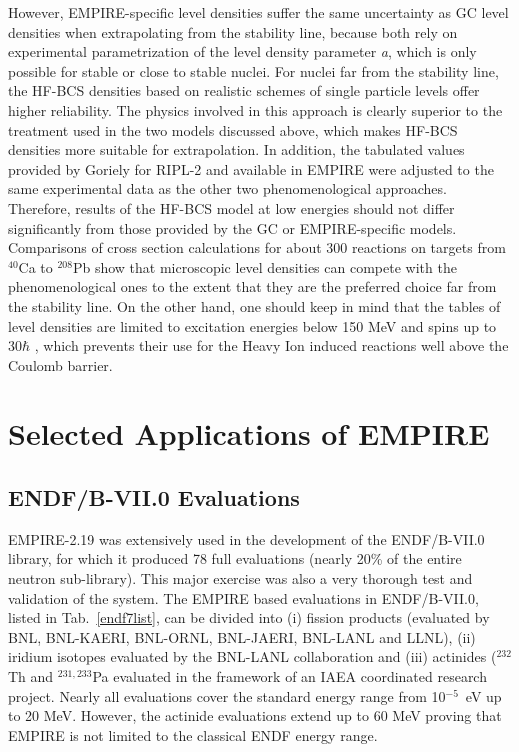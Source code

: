 However, EMPIRE-specific level densities suffer the same uncertainty
as GC level densities
when extrapolating from the stability line, because both rely on
experimental parametrization of the level density parameter \textit{a},
which is only possible for stable or close to stable nuclei. For nuclei far
from the stability line, the HF-BCS densities based on realistic schemes of
single particle levels offer higher reliability. The physics involved in
this approach is clearly superior to the treatment used in the two models
discussed above, which makes HF-BCS densities more suitable for
extrapolation. In addition, the tabulated values provided by Goriely for
RIPL-2 and available in EMPIRE were adjusted to the same experimental data
as the other two phenomenological approaches. Therefore, results of the
HF-BCS model at low energies should not differ significantly from those
provided by the GC or EMPIRE-specific models. Comparisons of cross section
calculations for about 300 reactions on targets from $^{40}$Ca to $^{208}$Pb
show that microscopic level densities can compete with the phenomenological
ones to the extent that they are the preferred choice far from the
stability line. On the other hand, one should keep in mind that the tables of
level densities are limited to excitation energies below 150 MeV and spins
up to 30$\hbar$ , which prevents their use for the Heavy Ion induced
reactions well above the Coulomb barrier.

\section{Selected Applications of EMPIRE}

\subsection{ENDF/B-VII.0 Evaluations}

EMPIRE-2.19 was extensively used in the development of the ENDF/B-VII.0
library, for which it produced 78 full evaluations (nearly 20\% of the entire
neutron sub-library). This major exercise was also a very thorough test and
validation of the system. The EMPIRE based evaluations in ENDF/B-VII.0,
listed in Tab.~\ref{endf7list}, can be divided into (i) fission products
(evaluated by BNL, BNL-KAERI, BNL-ORNL, BNL-JAERI, BNL-LANL and LLNL), (ii)
iridium isotopes evaluated by the BNL-LANL collaboration and (iii) actinides
($^{232}$Th and $^{231,233}$Pa evaluated in the framework of an IAEA
coordinated research project. Nearly all evaluations cover the standard
energy range from 10$^{-5}$~eV up to 20 MeV. However, the actinide
evaluations extend up to 60 MeV proving that EMPIRE is not limited to the
classical ENDF energy range.

